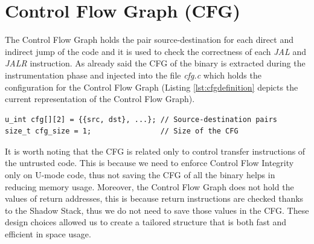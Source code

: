 \section{Control Flow Graph (CFG)}
\label{sec:project_cfg}

The Control Flow Graph holds the pair source-destination for each direct and indirect
jump of the code and it is used to check the correctness of each \textit{JAL}
and \textit{JALR} instruction. As already said the CFG of the binary is
extracted during the instrumentation phase and injected into the file \textit{cfg.c}
which holds the configuration for the Control Flow Graph (Listing
\ref{lst:cfgdefinition} depicts the current representation of the Control Flow
Graph). \\
\begin{lstlisting}[style=CStyle, caption= Definition of the Control Flow Graph inside \textit{cfg.c}, label={lst:cfgdefinition}]
u_int cfg[][2] = {{src, dst}, ...}; // Source-destination pairs
size_t cfg_size = 1;                // Size of the CFG
\end{lstlisting}

It is worth noting that the CFG is related only to control transfer instructions
of the untrusted code. This is because we need to enforce Control Flow Integrity
only on U-mode code, thus not saving the CFG of all the binary helps in reducing
memory usage. Moreover, the Control Flow Graph does not hold the values of return
addresses, this is because return instructions are checked thanks to the Shadow
Stack, thus we do not need to save those values in the CFG. These design choices
allowed us to create a tailored structure that is both fast and efficient in
space usage.

